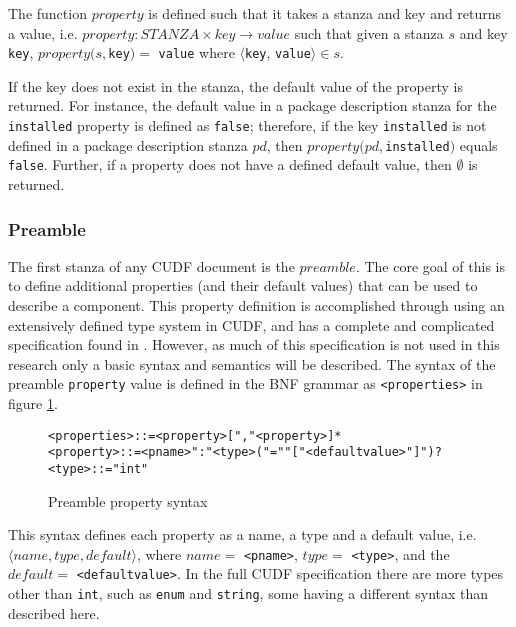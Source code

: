 The function $property$ is defined such that it takes a stanza and key and returns a value,
i.e. $property: STANZA \times key \rightarrow value$ such that given a stanza $s$ and key \verb+key+,
$property(s,$\verb+key+$) = $ \verb+value+ where $\langle$\verb+key+, \verb+value+$ \rangle \in s$.

If the key does not exist in the stanza, the default value of the property is returned.
For instance, the default value in a package description stanza for the \verb+installed+ property is defined as \verb+false+;
therefore, if the key \verb+installed+ is not defined in a package description stanza $pd$, then $property(pd,$\verb+installed+$)$ equals \verb+false+.
Further, if a property does not have a defined default value, then $\emptyset$ is returned.

\subsubsection{Preamble}
The first stanza of any CUDF document is the $preamble$.
The core goal of this is to define additional properties (and their default values) that can be used to describe a component.
This property definition is accomplished through using an extensively defined type system in CUDF, and has a complete and complicated specification found in \citep{treinen2009common}.
However, as much of this specification is not used in this research only a basic syntax and semantics will be described.
The syntax of the preamble \verb+property+ value is defined in the BNF grammar as \verb+<properties>+ in figure \ref{formal.cudfpropertysyntax}.

\begin{figure}[htp] 
\begin{center}
\begin{alltt}
<properties> ::= <property> ["," <property>]*
<property> :: = <pname> ":" <type> ("=" "["<defaultvalue>"]")?
<type> ::= "int"
\end{alltt}
  \caption{Preamble property syntax}
  \label{formal.cudfpropertysyntax}
\end{center}
\end{figure}

This syntax defines each property as a name, a type and a default value, i.e. $\langle name, type, default \rangle$, where $name = $ \verb+<pname>+, $type = $ \verb+<type>+,
and the $default =$ \verb+<defaultvalue>+. 
In the full CUDF specification there are more types other than \verb+int+, such as \verb+enum+ and \verb+string+,
some having a different syntax than described here.

